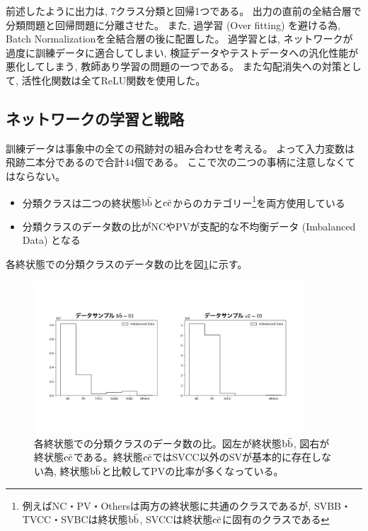 前述したように出力は, 7クラス分類と回帰1つである。
出力の直前の全結合層で分類問題と回帰問題に分離させた。
また, 過学習 (Over fitting) を避ける為, Batch Normalization\cite{BatchNormalizationpaper}を全結合層の後に配置した。
過学習とは, ネットワークが過度に訓練データに適合してしまい, 検証データやテストデータへの汎化性能が悪化してしまう, 教師あり学習の問題の一つである。
また勾配消失への対策として, 活性化関数は全てReLU関数を使用した。


\subsection{ネットワークの学習と戦略} \label{Net:PM:TrainingandStrategyofPM}

訓練データは事象中の全ての飛跡対の組み合わせを考える。
よって入力変数は飛跡二本分であるので合計$44$個である。
ここで次の二つの事柄に注意しなくてはならない。

\begin{itemize}
 \item 分類クラスは二つの終状態$\rm b\bar{b}$と$\rm c\bar{c}$からのカテゴリー\footnote{例えばNC・PV・Othersは両方の終状態に共通のクラスであるが, SVBB・TVCC・SVBCは終状態$\rm b\bar{b}$, SVCCは終状態$\rm c\bar{c}$に固有のクラスである}を両方使用している
 \item 分類クラスのデータ数の比がNCやPVが支配的な不均衡データ (Imbalanced Data) となる
\end{itemize}

各終状態での分類クラスのデータ数の比を図\ref{3-3-2-1ImbalancedData}に示す。

\begin{figure}[htbp]
 \centering
 \includegraphics[trim = 100 200 100 150, width=0.9\textwidth, clip]{Figure/3Networks/3-3-2-1ImbalancedData.png}
 \caption[各終状態での分類クラスのデータ数の比]{各終状態での分類クラスのデータ数の比。図左が終状態$\rm b\bar{b}$, 図右が終状態$\rm c\bar{c}$である。終状態$\rm c\bar{c}$ではSVCC以外のSVが基本的に存在しない為, 終状態$\rm b\bar{b}$と比較してPVの比率が多くなっている。}
 \label{3-3-2-1ImbalancedData}
\end{figure}

